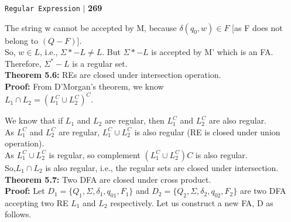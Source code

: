 \documentclass{article}
\begin{document}
\begin{flushright}
 \texttt{Regular Expression} \hspace*{0.1cm}\textbf{$|$} \hspace*{0.1cm} \textbf{269}\hspace*{0.1cm}
\end{flushright}

\vspace*{0.5cm}
\hspace*{0.5cm} The string w cannot be accepted by M, because $\delta(q_0, w)\in F$ [as F does not belong to $(Q - F)$].\\
\hspace*{0.5cm} So, $w \in L$, i.e., $\Sigma * - L \neq L$. But $\Sigma * - L$ is accepted by M' which is an FA.\\
\hspace*{0.5cm} Therefore, $\Sigma^* - L$ is a regular set.\\

\vspace*{0.3cm}
\textbf{Theorem 5.6:} REs are closed under intersection operation.\\

\vspace*{0.1cm}
\textbf{Proof:} From D’Morgan’s theorem, we know\\

\hspace*{4cm} $L_1 \cap L_2 = (L_1^C \cup L_2^C)^C.$

\hspace*{0.5cm} We know that if $L_1$ and $L_2$ are regular, then $L_1^C$ and $L_2^C$ are also regular.\\
\hspace*{0.5cm} As $L_1^C$ and $L_2^C$ are regular, $L_1^C \cup L_2^C$ is also regular (RE is closed under union operation).\\


\hspace*{0.5cm} As $L_1^C \cup L_2^C$ is regular, so complement $(L_1^C \cup L_2^C)C$ is also regular.\\
\hspace*{0.5cm} So,$L_1\cap L_2$ is also regular, i.e., the regular sets are closed under intersection.\\

\vspace*{0.4cm}
\textbf{Theorem 5.7:} Two DFA are closed under cross product.\\

\vspace*{0.3cm}
\textbf{Proof:} Let $D_1 = \{Q_1, \Sigma , \delta_1, q_01, F_1\}$ and $D_2 = \{Q_2, \Sigma , \delta_2, q_02, F_2\}$ are two DFA accepting two RE $L_1$ and
$L_2$ respectively. Let us construct a new FA, D as follows.\\
\end{document}
